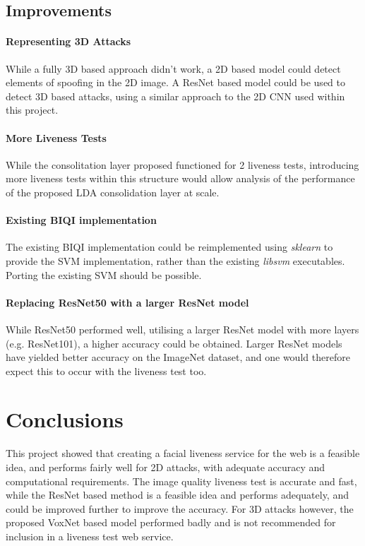 \documentclass[12pt,a4paper]{article}
\begin{document}
    \subsection{Improvements}
    \begin{multicols}{2}
        \paragraph{Representing 3D Attacks}
        While a fully 3D based approach didn't work, a 2D based model could detect elements of spoofing in the 2D image.
        A ResNet based model could be used to detect 3D based attacks, using a similar approach to the 2D CNN used within this project.

        \paragraph{More Liveness Tests}
        While the consolitation layer proposed functioned for 2 liveness tests, introducing more liveness tests within this structure would allow
        analysis of the performance of the proposed LDA consolidation layer at scale.

        \paragraph{Existing BIQI implementation}
            The existing BIQI implementation could be reimplemented using \emph{sklearn} to provide the SVM implementation, rather than the existing \emph{libsvm} executables.
            Porting the existing SVM should be possible.

        \paragraph{Replacing ResNet50 with a larger ResNet model}
        While ResNet50 performed well, utilising a larger ResNet model with more layers (e.g. ResNet101), a higher accuracy could be obtained.
        Larger ResNet models have yielded better accuracy on the ImageNet dataset, and one would therefore expect this to occur with the liveness test too.
    \end{multicols}
\section{Conclusions}
    This project showed that creating a facial liveness service for the web is a feasible idea, and performs fairly well for 2D attacks, with adequate accuracy and computational requirements.
    The image quality liveness test is accurate and fast, while the ResNet based method is a feasible idea and performs adequately, and could be improved further to improve the accuracy. For 3D attacks however, the
    proposed VoxNet based model performed badly and is not recommended for inclusion in a liveness test web service.
\end{document}
